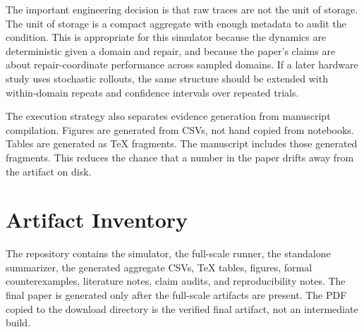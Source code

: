 \documentclass{article}
\begin{document}
The important engineering decision is that raw traces are not the unit of
storage. The unit of storage is a compact aggregate with enough metadata to
audit the condition. This is appropriate for this simulator because the dynamics
are deterministic given a domain and repair, and because the paper's claims are
about repair-coordinate performance across sampled domains. If a later hardware
study uses stochastic rollouts, the same structure should be extended with
within-domain repeats and confidence intervals over repeated trials.

The execution strategy also separates evidence generation from manuscript
compilation. Figures are generated from CSVs, not hand copied from notebooks.
Tables are generated as TeX fragments. The manuscript includes those generated
fragments. This reduces the chance that a number in the paper drifts away from
the artifact on disk.

\section{Artifact Inventory}

The repository contains the simulator, the full-scale runner, the standalone
summarizer, the generated aggregate CSVs, TeX tables, figures, formal
counterexamples, literature notes, claim audits, and reproducibility notes. The
final paper is generated only after the full-scale artifacts are present. The
PDF copied to the download directory is the verified final artifact, not an
intermediate build.
\end{document}
